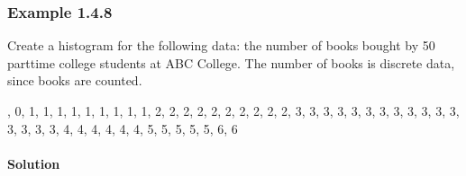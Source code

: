\documentclass[letterpaper,10pt,english]{jupyterBook}
\begin{document}
\subsubsection{Example 1.4.8}
\label{\detokenize{Ch1 Sampling and Data/1.4 Tables and Charts:example-1-4-8}}
\sphinxAtStartPar
Create a histogram for the following data: the number of books bought by 50 part\sphinxhyphen{}time college students at ABC College. The number of books is discrete data, since books are counted.

, 0, 1, 1, 1, 1, 1, 1, 1, 1, 1, 2, 2, 2, 2, 2, 2, 2, 2, 2, 2, 3, 3, 3, 3, 3, 3, 3, 3, 3, 3, 3, 3, 3, 3, 3, 3, 4, 4, 4, 4, 4, 4, 5, 5, 5, 5, 5, 6, 6


\paragraph{Solution}
\label{\detokenize{Ch1 Sampling and Data/1.4 Tables and Charts:id10}}
\end{document}
